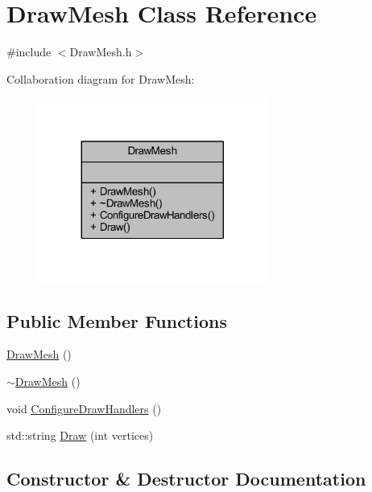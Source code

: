 \hypertarget{class_draw_mesh}{}\section{Draw\+Mesh Class Reference}
\label{class_draw_mesh}


{\ttfamily \#include $<$Draw\+Mesh.\+h$>$}



Collaboration diagram for Draw\+Mesh\+:\nopagebreak
\begin{figure}[H]
\begin{center}
\leavevmode
\includegraphics[width=212pt]{class_draw_mesh__coll__graph}
\end{center}
\end{figure}
\subsection*{Public Member Functions}
\begin{DoxyCompactItemize}
\item 
\mbox{\hyperlink{class_draw_mesh_a82e6b9552562eb9ac7a180e9e8c4d692}{Draw\+Mesh}} ()
\item 
\mbox{\hyperlink{class_draw_mesh_ab4abfd945c517dc323a27b372450bd74}{$\sim$\+Draw\+Mesh}} ()
\item 
void \mbox{\hyperlink{class_draw_mesh_ab095d024d70e38ae188307e14256b590}{Configure\+Draw\+Handlers}} ()
\item 
std\+::string \mbox{\hyperlink{class_draw_mesh_a5bb39b5c9cd69fd5c4decee6a875ca5a}{Draw}} (int vertices)
\end{DoxyCompactItemize}


\subsection{Constructor \& Destructor Documentation}
\mbox{\label{class_draw_mesh_a82e6b9552562eb9ac7a180e9e8c4d692}} 
